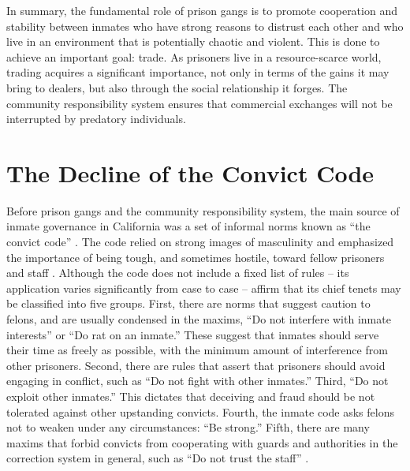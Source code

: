 \documentclass[a4paper, 12pt]{article}
\begin{document}
In summary, the fundamental role of prison gangs is to promote cooperation and stability between inmates who have strong reasons to distrust each other and who live in an environment that is potentially chaotic and violent. This is done to achieve an important goal: trade. As prisoners live in a resource-scarce world, trading acquires a significant importance, not only in terms of the gains it may bring to dealers, but also through the social relationship it forges. The community responsibility system ensures that commercial exchanges will not be interrupted by predatory individuals. 

\section{The Decline of the Convict Code}
\label{sec:convictcode} 

\noindent
Before prison gangs and the community responsibility system, the main source of inmate governance in California was a set of informal norms known as ``the convict code'' \citep{irwin1962thieves,irwin1970felon,jacobs1977stateville,sykes1960inmate}. The code relied on strong images of masculinity \citep{freeman1999correctional,hua2005patterns} and emphasized the importance of being tough, and sometimes hostile, toward fellow prisoners and staff \citep[pp. 369]{cole2013criminal}. Although the code does not include a fixed list of rules -- its application varies significantly from case to case  \citep[e.g.][]{akers1977prisonization,copes2013accounting,trammell2012enforcing} -- \citet[p. 5--9]{sykes1960inmate} affirm that its chief tenets may be classified into five groups. First, there are norms that suggest caution to felons, and are usually condensed in the maxims, ``Do not interfere with inmate interests'' or ``Do rat on an inmate.'' These suggest that inmates should serve their time as freely as possible, with the minimum amount of interference from other prisoners. Second, there are rules that assert that prisoners should avoid engaging in conflict, such as ``Do not fight with other inmates.'' Third, ``Do not exploit other inmates.'' This dictates that deceiving and fraud should be not tolerated against other upstanding convicts. Fourth, the inmate code asks felons not to weaken under any circumstances: ``Be strong.'' Fifth, there are many maxims that forbid convicts from cooperating with guards and authorities in the correction system in general, such as ``Do not trust the staff'' \citep[p. 525]{sutherland1992principles}. 
\end{document}
